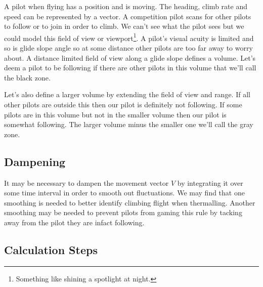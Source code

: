 \documentclass[gap.tex]{subfiles}
\begin{document}
A pilot when flying has a position and is moving. The heading, climb rate and
speed can be represented by a vector. A competition pilot scans for other
pilots to follow or to join in order to climb. We can't see what the pilot sees
but we could model this field of view or viewport\footnote{Something like
shining a spotlight at night.}. A pilot's visual acuity is limited and so is
glide slope angle so at some distance other pilots are too far away to worry
about. A distance limited field of view along a glide slope defines a volume.
Let's deem a pilot to be following if there are other pilots in this volume
that we'll call the black zone.

Let's also define a larger volume by extending the field of view and range. If
all other pilots are outside this then our pilot is definitely not following.
If some pilots are in this volume but not in the smaller volume then our pilot
is somewhat following. The larger volume minus the smaller one we'll call the
gray zone.

\subsection{Dampening}
It may be necessary to dampen the movement vector \(V\) by integrating it over
some time interval in order to smooth out fluctuations. We may find that one
smoothing is needed to better identify climbing flight when thermalling.
Another smoothing may be needed to prevent pilots from gaming this rule by
tacking away from the pilot they are infact following.

\subsection{Calculation Steps}
\end{document}
